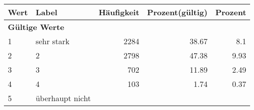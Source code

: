      \begin{longtable}{lXrrr}
     \toprule
     \textbf{Wert} & \textbf{Label} & \textbf{Häufigkeit} & \textbf{Prozent(gültig)} & \textbf{Prozent} \\
     \endhead
     \midrule
     \multicolumn{5}{l}{\textbf{Gültige Werte}}\\

     1 &
     \multicolumn{1}{X}{ sehr stark   } &


       \num{2284} &
       \num[round-mode=places,round-precision=2]{38,67} &
         \num[round-mode=places,round-precision=2]{8,1} \\

     2 &
     \multicolumn{1}{X}{ 2   } &


       \num{2798} &
       \num[round-mode=places,round-precision=2]{47,38} &
         \num[round-mode=places,round-precision=2]{9,93} \\

     3 &
     \multicolumn{1}{X}{ 3   } &


       \num{702} &
       \num[round-mode=places,round-precision=2]{11,89} &
         \num[round-mode=places,round-precision=2]{2,49} \\

     4 &
     \multicolumn{1}{X}{ 4   } &


       \num{103} &
       \num[round-mode=places,round-precision=2]{1,74} &
         \num[round-mode=places,round-precision=2]{0,37} \\

     5 &
     \multicolumn{1}{X}{ überhaupt nicht   } &



\end{longtable}
